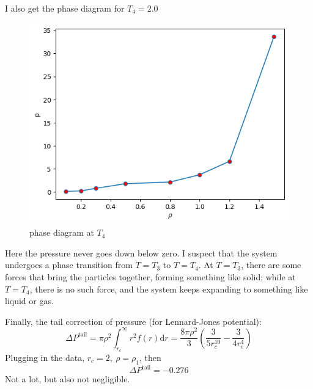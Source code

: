 \documentclass[letterpaper,12pt]{article}
\numberwithin{equation}{section}
\begin{document}
I also get the phase diagram for $T_4=2.0$
\begin{figure}[H]
    \centering
    \includegraphics{Project/phase_diagram2.png}
    \caption{phase diagram at $T_4$}
    \label{fig:phase_diagram2}
\end{figure}
Here the pressure never goes down below zero. I suspect that the system undergoes a phase transition from $T=T_3$ to $T=T_4$. At $T=T_3$, there are some forces that bring the particles together, forming something like solid; while at $T=T_4$, there is no such force, and the system keeps expanding to something like liquid or gas. 

Finally, the tail correction of pressure (for Lennard-Jones potential):
\begin{equation}
    \Delta P^{\mathrm{tail}}=\pi\rho^2\int_{r_c}^\infty{r^2f(r)\mathrm{d}r}=\frac{8\pi\rho^2}{3}\left(\frac{3}{5r_c^{10}}-\frac{3}{4r_c^4}\right)
\end{equation}
Plugging in the data, $r_c=2,\ \rho=\rho_1$, then
\begin{equation}
    \Delta P^{\mathrm{tail}}=-0.276
\end{equation}
Not a lot, but also not negligible. 

\end{document}
